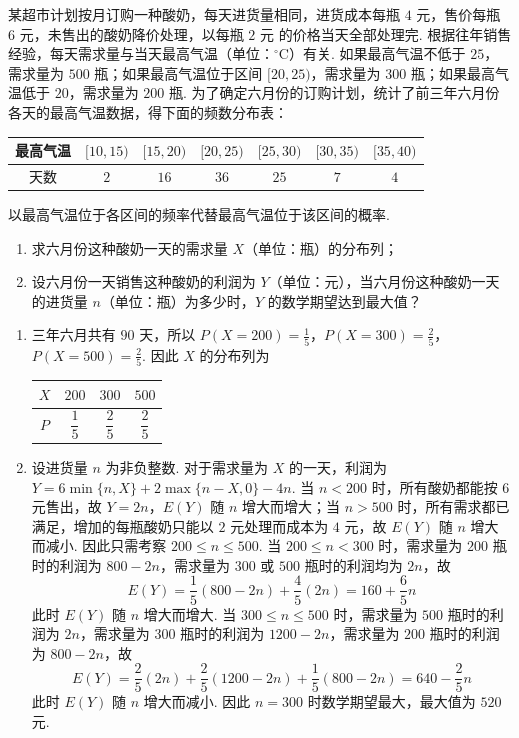 \begin{problem}
某超市计划按月订购一种酸奶，每天进货量相同，进货成本每瓶 \(4\text{ 元}\)，售价每瓶 \(6\text{ 元}\)，未售出的酸奶降价处理，以每瓶 \(2\text{ 元}\) 的价格当天全部处理完. 根据往年销售经验，每天需求量与当天最高气温（单位：\(^{\circ}\mathrm{C}\)）有关. 如果最高气温不低于 \(25\)，需求量为 \(500\text{ 瓶}\)；如果最高气温位于区间 \([20,25)\)，需求量为 \(300\text{ 瓶}\)；如果最高气温低于 \(20\)，需求量为 \(200\text{ 瓶}\). 为了确定六月份的订购计划，统计了前三年六月份各天的最高气温数据，得下面的频数分布表：

\begin{center}
\begin{tabular}{c|cccccc}
最高气温 & \([10,15)\) & \([15,20)\) & \([20,25)\) & \([25,30)\) & \([30,35)\) & \([35,40)\) \\
\hline
天数 & \(2\) & \(16\) & \(36\) & \(25\) & \(7\) & \(4\)
\end{tabular}
\end{center}

以最高气温位于各区间的频率代替最高气温位于该区间的概率.

\begin{enumerate}
\item 求六月份这种酸奶一天的需求量 \(X\)（单位：瓶）的分布列；
\item 设六月份一天销售这种酸奶的利润为 \(Y\)（单位：元），当六月份这种酸奶一天的进货量 \(n\)（单位：瓶）为多少时，\(Y\) 的数学期望达到最大值？
\end{enumerate}
\end{problem}

\begin{solution}
\begin{enumerate}
\item 三年六月共有 \(90\) 天，所以 \(P(X=200)=\frac15\)，\(P(X=300)=\frac25\)，\(P(X=500)=\frac25\).
因此 \(X\) 的分布列为
\begin{center}
\begin{tabular}{c|ccc}
\(X\) & \(200\) & \(300\) & \(500\) \\
\hline
\(P\) & \(\dfrac15\) & \(\dfrac25\) & \(\dfrac25\)
\end{tabular}
\end{center}
\item 设进货量 \(n\) 为非负整数. 对于需求量为 \(X\) 的一天，利润为 \(Y=6\min\{n,X\}+2\max\{n-X,0\}-4n\). 当 \(n<200\) 时，所有酸奶都能按 \(6\) 元售出，故 \(Y=2n\)，\(E(Y)\) 随 \(n\) 增大而增大；当 \(n>500\) 时，所有需求都已满足，增加的每瓶酸奶只能以 \(2\) 元处理而成本为 \(4\) 元，故 \(E(Y)\) 随 \(n\) 增大而减小. 因此只需考察 \(200\le n\le500\). 当 \(200\le n<300\) 时，需求量为 \(200\) 瓶时的利润为 \(800-2n\)，需求量为 \(300\) 或 \(500\) 瓶时的利润均为 \(2n\)，故
\[
E(Y)=\frac15(800-2n)+\frac45(2n)=160+\frac65n
\]
此时 \(E(Y)\) 随 \(n\) 增大而增大. 当 \(300\le n\le500\) 时，需求量为 \(500\) 瓶时的利润为 \(2n\)，需求量为 \(300\) 瓶时的利润为 \(1200-2n\)，需求量为 \(200\) 瓶时的利润为 \(800-2n\)，故
\[
E(Y)=\frac25(2n)+\frac25(1200-2n)+\frac15(800-2n)=640-\frac25n
\]
此时 \(E(Y)\) 随 \(n\) 增大而减小. 因此 \(n=300\) 时数学期望最大，最大值为 \(520\) 元.
\end{enumerate}
\end{solution}

